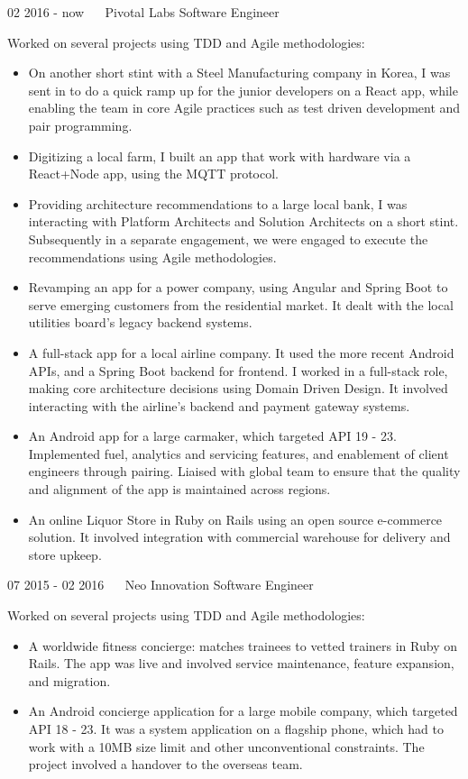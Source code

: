 \documentclass[]{friggeri-cv}
\begin{document}
\begin{entrylist}
	\entry
	{02 2016 - now  \ \ }
	{Pivotal Labs}
	{Software Engineer}
	{Worked on several projects using TDD and Agile methodologies:
	\begin{itemize}[itemsep=0pt,topsep=0pt]
	\item On another short stint with a Steel Manufacturing company in Korea, I was sent in to do a quick ramp up for the junior developers on a React app, while enabling the team in core Agile practices such as test driven development and pair programming.
	\item Digitizing a local farm, I built an app that work with hardware via a React+Node app, using the MQTT protocol.
	\item Providing architecture recommendations to a large local bank, I was interacting with Platform Architects and Solution Architects on a short stint. Subsequently in a separate engagement, we were engaged to execute the recommendations using Agile methodologies.
	\item Revamping an app for a power company, using Angular and Spring Boot to serve emerging customers from the residential market. It dealt with the local utilities board's legacy backend systems.
	\item A full-stack app for a local airline company. It used the more recent Android APIs, and a Spring Boot backend for frontend. I worked in a full-stack role, making core architecture decisions using Domain Driven Design. It involved interacting with the airline's backend and payment gateway systems.
	\item An Android app for a large carmaker, which targeted API 19 - 23. Implemented fuel, analytics and servicing features, and enablement of client engineers through pairing. Liaised with global team to ensure that the quality and alignment of the app is maintained across regions.
	\item An online Liquor Store in Ruby on Rails using an open source e-commerce solution. It involved integration with commercial warehouse for delivery and store upkeep.
	\end{itemize}}
	
	\entry
	{07 2015 - 02 2016   \ \ }
	{Neo Innovation}
	{Software Engineer}
	{Worked on several projects using TDD and Agile methodologies:
	\begin{itemize}[itemsep=0pt,topsep=0pt]
	\item A worldwide fitness concierge: matches trainees to vetted trainers in Ruby on Rails. The app was live and involved service maintenance, feature expansion, and migration.
	\item An Android concierge application for a large mobile company, which targeted API 18 - 23. It was a system application on a flagship phone, which had to work with a 10MB size limit and other unconventional constraints. The project involved a handover to the overseas team.
	\end{itemize}}


\end{entrylist}
\end{document}
